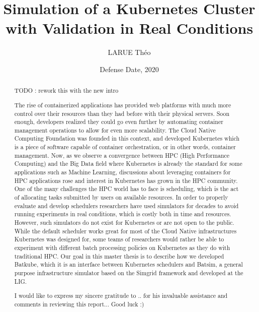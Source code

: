 \documentclass[12pt, a4paper]{memoir}
\title{Simulation of a Kubernetes Cluster with Validation in Real Conditions} %
\author{LARUE Théo}
\date{Defense Date, 2020} %
\begin{document}
\frontmatter
\begin{titlingpage}
\maketitle
\end{titlingpage}

\setlength{\parskip}{-1pt plus 1pt}

\renewcommand{\abstracttextfont}{\normalfont}
\abstractintoc
\begin{abstract} 
	TODO : rework this with the new intro


	The rise of containerized applications has provided web platforms with
	much more control over their resources than they had before with their
	physical servers. Soon enough, developers realized they could go even
	further by automating container management operations to allow for even
	more scalability. The Cloud Native Computing Foundation was founded in
	this context, and developed Kubernetes which is a piece of software
	capable of container orchestration, or in other words, container
	management. Now, as we observe a convergence between HPC (High
	Performance Computing) and the Big Data field where Kubernetes is
	already the standard for some applications such as Machine Learning,
	discussions about leveraging containers for HPC applications rose and
	interest in Kubernetes has grown in the HPC community. One of the many
	challenges the HPC world has to face is scheduling, which is the act of
	allocating tasks submitted by users on available resources. In order to
	properly evaluate and develop schedulers researchers have used
	simulators for decades to avoid running experiments in real conditions,
	which is costly both in time and resources. However, such simulators do
	not exist for Kubernetes or are not open to the public. While the
	default scheduler works great for most of the Cloud Native
	infrastructures Kubernetes was designed for, some teams of researchers
	would rather be able to experiment with different batch processing
	policies on Kubernetes as they do with traditional HPC. Our goal in
	this master thesis is to describe how we developed Batkube, which it is
	an interface between Kubernetes schedulers and Batsim, a general
	purpose infrastructure simulator based on the Simgrid framework and
	developed at the LIG.

\end{abstract}
\abstractintoc

\renewcommand\abstractname{Acknowledgement}
\begin{abstract}
I would like to express my sincere gratitude to .. for his invaluable assistance and comments in reviewing this report... 
Good luck :) 
\end{abstract}
\end{document}
